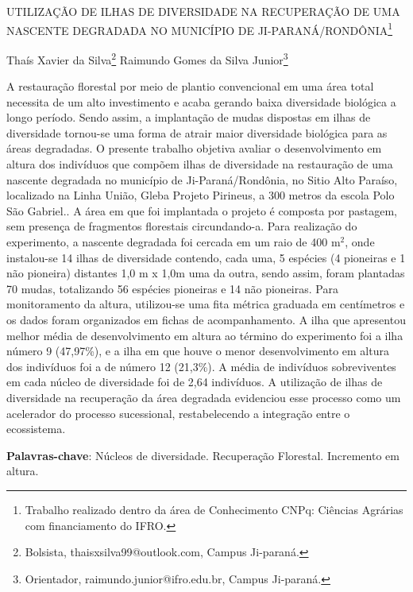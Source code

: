 \documentclass[article,12pt,onesidea,4paper,english,brazil]{abntex2}
\begin{document}
	
	
	\frenchspacing 
	
	\begin{center}
		\LARGE UTILIZAÇÃO DE ILHAS DE DIVERSIDADE NA RECUPERAÇÃO DE UMA NASCENTE DEGRADADA NO MUNICÍPIO DE JI-PARANÁ/RONDÔNIA\footnote{Trabalho realizado dentro da área de Conhecimento CNPq: Ciências Agrárias com financiamento do IFRO.}
		
		\normalsize
		Thaís Xavier da Silva\footnote{Bolsista, thaisxsilva99@outlook.com, Campus Ji-paraná.} 
	Raimundo Gomes da Silva Junior\footnote{Orientador, raimundo.junior@ifro.edu.br, Campus Ji-paraná.} 
	\end{center}
	
	\noindent A restauração florestal por meio de plantio convencional em uma área total necessita de um alto investimento e acaba gerando baixa diversidade biológica a longo período. Sendo assim, a implantação de mudas dispostas em ilhas de diversidade tornou-se uma forma de atrair maior diversidade biológica para as áreas degradadas. O presente trabalho objetiva avaliar o desenvolvimento em altura dos indivíduos que compõem ilhas de diversidade na restauração de uma nascente degradada no município de Ji-Paraná/Rondônia, no Sitio Alto Paraíso, localizado na Linha União, Gleba Projeto Pirineus, a 300 metros da escola Polo São Gabriel.. A área em que foi implantada o projeto é composta por pastagem, sem presença de fragmentos florestais circundando-a. Para realização do experimento, a nascente degradada foi cercada em um raio de 400 m$^2$, onde instalou-se 14 ilhas de diversidade contendo, cada uma, 5 espécies (4 pioneiras e 1 não pioneira) distantes 1,0 m x 1,0m uma da outra, sendo assim, foram plantadas 70 mudas, totalizando 56 espécies pioneiras e 14 não pioneiras. Para monitoramento da altura, utilizou-se uma fita métrica graduada em centímetros e os dados foram organizados em fichas de acompanhamento. A ilha que apresentou melhor média de desenvolvimento em altura ao término do experimento foi a ilha número 9 (47,97\%), e a ilha em que houve o menor desenvolvimento em altura dos indivíduos foi a de número 12 (21,3\%). A média de indivíduos sobreviventes em cada núcleo de diversidade foi de 2,64 indivíduos. A utilização de ilhas de diversidade na recuperação da área degradada evidenciou esse processo como um acelerador do processo sucessional, restabelecendo a integração entre o ecossistema.
	\vspace{\onelineskip}
	
	\noindent
	\textbf{Palavras-chave}: Núcleos de diversidade. Recuperação Florestal. Incremento em altura. 
	
\end{document}
